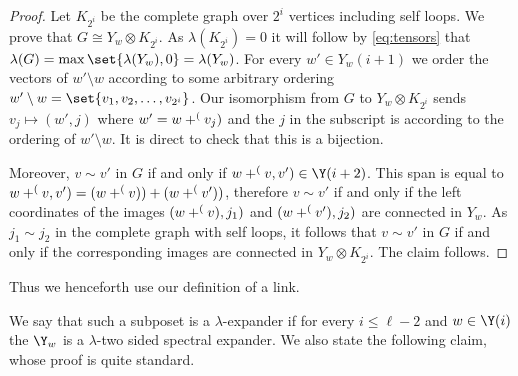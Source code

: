 \begin{proof}
    Let \(K_{2^i}\) be the complete graph over \(2^i\) vertices including self loops. We prove that \(G \cong Y_w \otimes K_{2^i}\). As \(\lambda(K_{2^i}) = 0\) it will follow by \eqref{eq:tensors} that \(\lambda(G) = \max \set{\lambda(Y_w),0} = \lambda(Y_w)\). For every \(w' \in Y_w(i+1)\) we order the vectors of \(w' \setminus w\) according to some arbitrary ordering \(w' \setminus w = \set{v_1,v_2,\dots,v_{2^i}}\). Our isomorphism from \(G\) to \(Y_w \otimes K_{2^i}\) sends \(v_j \mapsto (w',j)\) where \(w'= w+\sp (v_j)\) and the \(j\) in the subscript is according to the ordering of \(w' \setminus w\). It is direct to check that this is a bijection.

    Moreover, \(v \sim v'\) in \(G\) if and only if \(w + \sp(v,v') \in \Y(i+2)\). This span is equal to \(w + \sp(v,v') = (w+ \sp(v)) + (w+ \sp(v'))\), therefore \(v \sim v'\) if and only if the left coordinates of the images \((w+\sp(v),j_1)\) and \((w+\sp(v'),j_2)\) are connected in \(Y_w\). As \(j_1 \sim j_2\) in the complete graph with self loops, it follows that \(v \sim v'\) in \(G\) if and only if the corresponding images are connected in \(Y_w \otimes K_{2^i}\). The claim follows.
\end{proof}
    

Thus we henceforth use our definition of a link.

We say that such a subposet is a \(\lambda\)-expander if for every \(i \leq \ell-2\) and \(w \in \Y(i)\) the \(\Y_w\) is a \(\lambda\)-two sided spectral expander. We also state the following claim, whose proof is quite standard.

